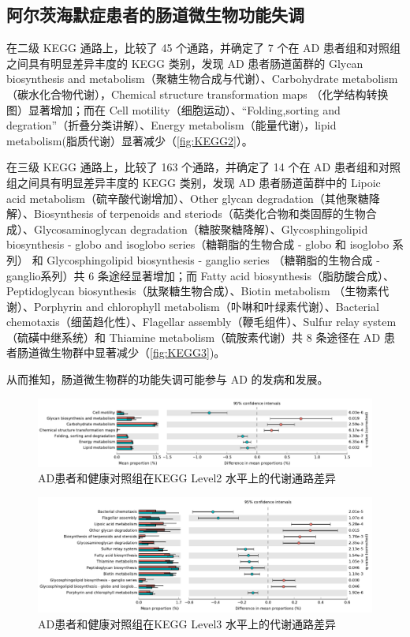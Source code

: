 \documentclass[supercite]{HustGraduPaper}
\begin{document}
\subsection{阿尔茨海默症患者的肠道微生物功能失调}
在二级 KEGG 通路上，比较了 45 个通路，并确定了 7 个在 AD 患者组和对照组之间具有明显差异丰度的 KEGG 类别，发现 AD 患者肠道菌群的 Glycan biosynthesis and metabolism（聚糖生物合成与代谢）、Carbohydrate metabolism（碳水化合物代谢），Chemical structure transformation maps （化学结构转换图）显著增加；而在 Cell motility（细胞运动）、“Folding,sorting and degration”（折叠分类讲解）、Energy metabolism（能量代谢)，lipid metabolism(脂质代谢）显著减少（\autoref{fig:KEGG2}）。

在三级 KEGG 通路上，比较了 163 个通路，并确定了 14 个在 AD 患者组和对照组之间具有明显差异丰度的 KEGG 类别，发现 AD 患者肠道菌群中的 Lipoic acid metabolism（硫辛酸代谢增加）、Other glycan degradation（其他聚糖降解）、Biosynthesis of terpenoids and steriods（萜类化合物和类固醇的生物合成）、Glycosaminoglycan degradation（糖胺聚糖降解）、Glycosphingolipid biosynthesis - globo and isoglobo series（糖鞘脂的生物合成 - globo 和 isoglobo 系列） 和 Glycosphingolipid biosynthesis - ganglio series （糖鞘脂的生物合成 - ganglio系列）共 6 条途经显著增加；而 Fatty acid biosynthesis（脂肪酸合成）、Peptidoglycan biosynthesis（肽聚糖生物合成）、Biotin metabolism （生物素代谢）、Porphyrin and chlorophyll metabolism（卟啉和叶绿素代谢）、Bacterial chemotaxis（细菌趋化性）、Flagellar assembly（鞭毛组件）、Sulfur relay system（硫磺中继系统）和 Thiamine metabolism（硫胺素代谢）共 8 条途径在 AD 患者肠道微生物群中显著减少（\autoref{fig:KEGG3})。

从而推知，肠道微生物群的功能失调可能参与 AD 的发病和发展。
\begin{figure}[htb]
	\includegraphics[width=\textwidth]{plot/KEGG2.pdf}
	\caption{AD患者和健康对照组在KEGG Level2 水平上的代谢通路差异}
	\label{fig:KEGG2}
\end{figure}
\begin{figure}[htb]
	\includegraphics[width=\textwidth]{plot/KEGG3.pdf}
	\caption{AD患者和健康对照组在KEGG Level3 水平上的代谢通路差异}
	\label{fig:KEGG3}
\end{figure}
\end{document}
